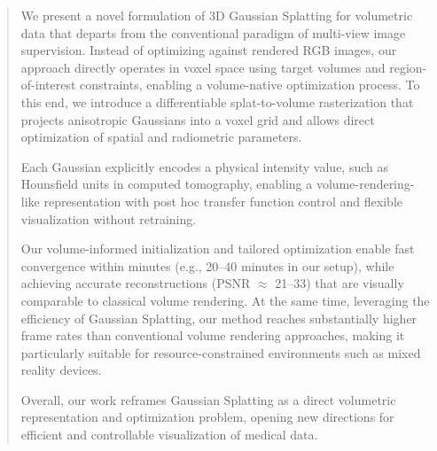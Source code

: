 \documentclass[runningheads]{llncs}
\begin{document}
\begin{abstract}
We present a novel formulation of 3D Gaussian Splatting for volumetric data that departs from the conventional paradigm of multi-view image supervision. Instead of optimizing against rendered RGB images, our approach directly operates in voxel space using target volumes and region-of-interest constraints, enabling a volume-native optimization process. To this end, we introduce a differentiable splat-to-volume rasterization that projects anisotropic Gaussians into a voxel grid and allows direct optimization of spatial and radiometric parameters.

Each Gaussian explicitly encodes a physical intensity value, such as Hounsfield units in computed tomography, enabling a volume-rendering-like representation with post hoc transfer function control and flexible visualization without retraining.

Our volume-informed initialization and tailored optimization enable fast convergence within minutes (e.g., 20--40 minutes in our setup), while achieving accurate reconstructions (PSNR $\approx$ 21--33) that are visually comparable to classical volume rendering. At the same time, leveraging the efficiency of Gaussian Splatting, our method reaches substantially higher frame rates than conventional volume rendering approaches, making it particularly suitable for resource-constrained environments such as mixed reality devices.

Overall, our work reframes Gaussian Splatting as a direct volumetric representation and optimization problem, opening new directions for efficient and controllable visualization of medical data.





\end{abstract}
\end{document}
